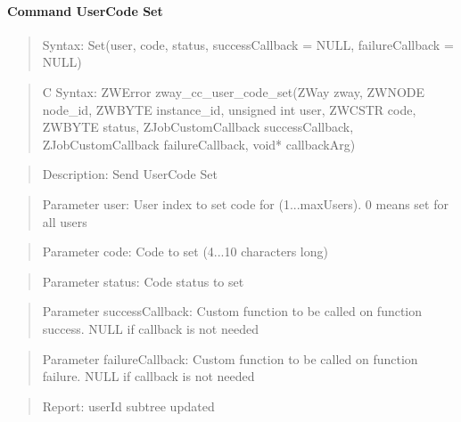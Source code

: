 \paragraph{Command UserCode Set}
\begin{quote}Syntax: Set(user, code, status, successCallback = NULL, failureCallback = NULL)\end{quote}
\begin{quote}C Syntax: ZWError zway\_cc\_user\_code\_set(ZWay zway, ZWNODE node\_id, ZWBYTE instance\_id, unsigned int user, ZWCSTR code, ZWBYTE status, ZJobCustomCallback successCallback, ZJobCustomCallback failureCallback, void* callbackArg)\end{quote}
\begin{quote}Description: Send UserCode Set\end{quote}
\begin{quote}Parameter user: User index to set code for (1...maxUsers). 0 means set for all users\end{quote}
\begin{quote}Parameter code: Code to set (4...10 characters long)\end{quote}
\begin{quote}Parameter status: Code status to set\end{quote}
\begin{quote}Parameter successCallback: Custom function to be called on function success. NULL if callback is not needed\end{quote}
\begin{quote}Parameter failureCallback: Custom function to be called on function failure. NULL if callback is not needed\end{quote}
\begin{quote}Report: userId subtree updated\end{quote}

